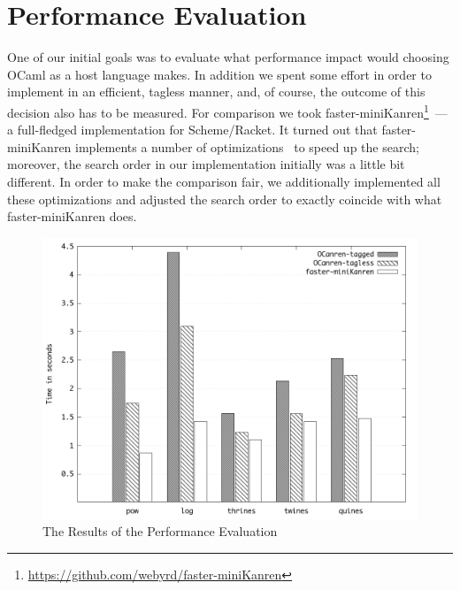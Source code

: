 

\section{Performance Evaluation}
\label{sec:evaluation}

One of our initial goals was to evaluate what performance impact would choosing OCaml as a host language makes. In addition we spent some
effort in order to implement \miniKanren in an efficient, tagless manner, and, of course, the outcome of this decision also has to be
measured. For comparison we took faster-miniKanren\footnote{\url{https://github.com/webyrd/faster-miniKanren}}~--- a full-fledged
\miniKanren implementation for Scheme/Racket. It turned out that faster-miniKanren implements a number of optimizations~\cite{WillThesis, Optimizations}
to speed up the search; moreover, the search order in our implementation initially was a little bit different. In order to make the comparison
fair, we additionally implemented all these optimizations and adjusted the search order to exactly coincide with
what faster-miniKanren does.

\begin{figure}[t]
\centering
\includegraphics[scale=0.4]{graph.png}
\caption{The Results of the Performance Evaluation}
\label{eval}
\end{figure}

